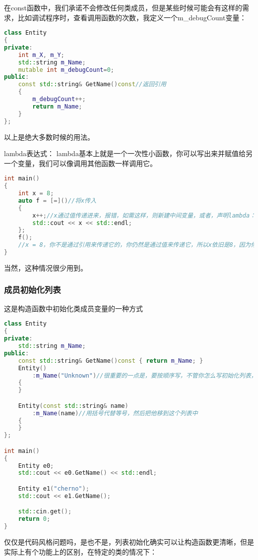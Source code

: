 在{\ncodestyle const}函数中，我们承诺不会修改任何类成员，但是某些时候可能会有这样的需求，比如调试程序时，查看调用函数的次数，我定义一个{\ncodestyle m_debugCount}变量：

\begin{lstlisting}[language=c++]
class Entity
{
private:
    int m_X, m_Y;
    std::string m_Name;
    mutable int m_debugCount=0;
public:
    const std::string& GetName()const//返回引用
    {
        m_debugCount++;
        return m_Name;
    }
};
\end{lstlisting}

以上是绝大多数时候的用法。

lambda表达式：
lambda基本上就是一个一次性小函数，你可以写出来并赋值给另一个变量，我们可以像调用其他函数一样调用它。

\begin{lstlisting}[language=c++]
int main()
{
    int x = 8;
    auto f = [=]()//将x传入
    {
        x++;//x通过值传递进来，报错，如需这样，则新建中间变量，或者，声明lambda：auto f = [=]()mutabl
        std::cout << x << std::endl;
    };
    f();
    //x = 8，你不是通过引用来传递它的，你仍然是通过值来传递它，所以x依旧是8，因为你只是复制了8这个值传进了lambda
}
\end{lstlisting}

当然，这种情况很少用到。

\subsubsection{成员初始化列表}

这是构造函数中初始化类成员变量的一种方式


\begin{lstlisting}[language=c++]
class Entity
{
private:
    std::string m_Name;
public:
    const std::string& GetName()const { return m_Name; }
    Entity()
        :m_Name("Unknown")//很重要的一点是，要按顺序写，不管你怎么写初始化列表，她都会按照定义类成员的顺序来进行初始化。
    {
    }

    Entity(const std::string& name)
        :m_Name(name)//用括号代替等号，然后把他移到这个列表中
    {
    }
};

int main()
{
    Entity e0;
    std::cout << e0.GetName() << std::endl;

    Entity e1("cherno");
    std::cout << e1.GetName();

    std::cin.get();
    return 0;
}
\end{lstlisting}


仅仅是代码风格问题吗，是也不是，列表初始化确实可以让构造函数更清晰，但是实际上有个功能上的区别，在特定的类的情况下：

